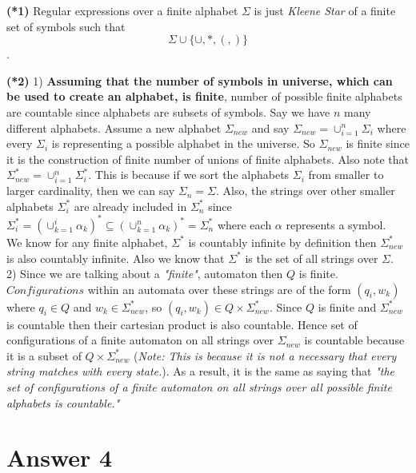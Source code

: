\documentclass[12pt]{article}
\begin{document}
\textbf{(*1)}
Regular expressions over a finite alphabet $\Sigma$ is just \textit{Kleene Star} of a finite set of symbols such that $$\Sigma \cup \{\cup, *, (, )\}$$.

\textbf{(*2)}
1) \textbf{Assuming that the number of symbols in universe, which can be used to create an alphabet, is finite}, number of possible finite alphabets are countable since alphabets are subsets of symbols. Say we have $n$ many different alphabets.
Assume a new alphabet $\Sigma_{new}$ and say $\Sigma_{new}=\cup_{i=1}^n \Sigma_i$ where every $\Sigma_i$ is representing a possible alphabet in the universe. So $\Sigma_{new}$ is finite since it is the construction of finite number of unions of finite alphabets. Also note that $\Sigma_{new}^*=\cup_{i=1}^n \Sigma_i^*$. This is because if we sort the alphabets $\Sigma_i$ from smaller to larger cardinality, then we can say $\Sigma_n=\Sigma$. Also, the strings over other smaller alphabets $\Sigma_i^*$ are already included in $\Sigma_n^*$ since $\Sigma_i^*=(\cup_{k=1}^i \alpha_k)^* \subseteq (\cup_{k=1}^n \alpha_k)^* = \Sigma_n^*$ where each $\alpha$ represents a symbol. \\

We know for any finite alphabet, $\Sigma^*$ is countably infinite by definition then $\Sigma_{new}^*$ is also countably infinite. Also we know that $\Sigma^*$ is the set of all strings over $\Sigma$.\\

2) Since we are talking about a \textit{"finite"}, automaton then $Q$ is finite.\\

$Configurations$ within an automata over these strings are of the form $(q_i, w_k)$ where $q_i\in Q$ and $w_k\in \Sigma_{new}^*$, so $(q_i, w_k) \in Q \times \Sigma_{new}^*$. Since $Q$ is finite and $\Sigma_{new}^*$ is countable then their cartesian product is also countable. Hence set of configurations of a finite automaton on all strings over $\Sigma_{new}$ is countable because it is a subset of $Q \times \Sigma_{new}^*$ (\textit{Note: This is because it is not a necessary that every string matches with every state.}). As a result, it is the same as saying that \textit{"the set of configurations of a finite automaton on all strings over all possible finite alphabets is countable."}\\

\section*{Answer 4}
\end{document}
